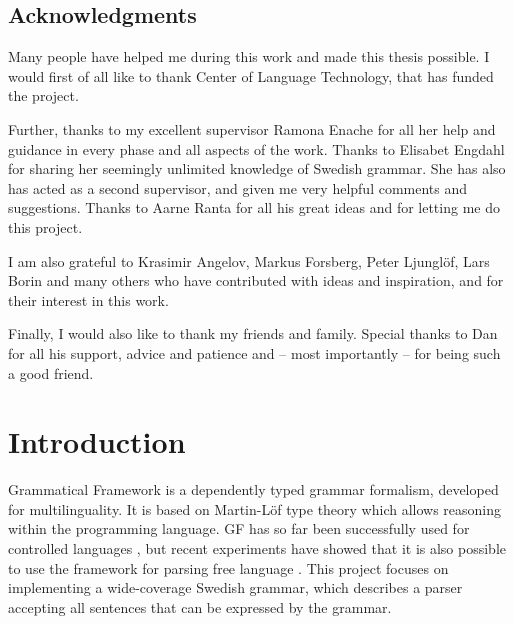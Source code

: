 \documentclass{report}
\begin{document}
\newpage
\pagestyle{empty}
\section*{Acknowledgments}
\vspace{5mm}
Many people have helped me during this work and made this thesis possible.
I would first of all like to thank
Center of Language Technology, that has funded the project.

Further, thanks to my excellent 
supervisor Ramona Enache for all her help and guidance 
in every phase and all aspects of the work.
Thanks to Elisabet Engdahl for sharing her seemingly unlimited knowledge
of Swedish grammar. She has also has acted as a second supervisor, and given me
very helpful comments and suggestions. Thanks to Aarne Ranta for all his great
ideas and for letting me do this project.

I am also grateful to Krasimir Angelov, Markus Forsberg, Peter Ljunglöf, Lars Borin
and many others who have contributed with ideas and inspiration, and for their
interest in this work.

Finally, I would also like to thank my friends and family. Special thanks to Dan %
for all his support, advice and patience and  -- most importantly -- for being
such a good friend. %

\newpage
\tableofcontents
%
\newpage
\setcounter{page}{1} %
\chapter{Introduction}
Grammatical Framework \cite{gfbok} is a dependently typed grammar formalism,
developed for multilinguality. It is based on Martin-Löf type theory which allows
reasoning within the programming language.
GF has so far been successfully used for 
controlled languages \cite{cnl}, but recent experiments have showed
that it is also possible to use the framework for parsing free language \cite{patent}.
This project focuses on implementing a wide-coverage Swedish grammar, which
describes a parser accepting all sentences that can be expressed by the grammar.
\end{document}
